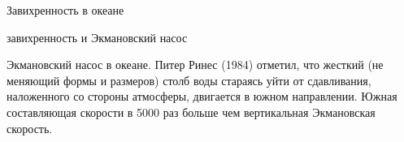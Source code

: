 \begin{chapter}{Завихренность в океане}
\begin{section}{завихренность и Экмановский насос}
\begin{paragraph}{Экмановский насос в океане.}
Питер Ринес (1984) отметил, что жесткий (не меняющий формы и размеров)
столб воды стараясь уйти от сдавливания, наложенного со стороны
атмосферы, двигается в южном направлении. Южная составляющая скорости
в 5000 раз больше чем вертикальная Экмановская скорость.
%


\end{paragraph}
\end{section}
\end{chapter}
